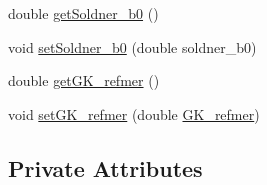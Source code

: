 \begin{DoxyCompactItemize}
\item 
double \hyperlink{classparams_1_1_ellipsoid_parms_a2d57a7d2449fb7bbf6fbc0f66ae85848}{get\+Soldner\+\_\+b0} ()
\item 
void \hyperlink{classparams_1_1_ellipsoid_parms_a0ab99cecabf398adc130b15c8f3e23c5}{set\+Soldner\+\_\+b0} (double soldner\+\_\+b0)
\item 
double \hyperlink{classparams_1_1_ellipsoid_parms_aaa87eb361d5f0be95d014842b8201cea}{get\+G\+K\+\_\+refmer} ()
\item 
void \hyperlink{classparams_1_1_ellipsoid_parms_a711a94a4e810fa3acd91cabc94ef8b73}{set\+G\+K\+\_\+refmer} (double \hyperlink{classparams_1_1_ellipsoid_parms_a86b4e7b5eb4b4f2f671e61e75e0dc7f9}{G\+K\+\_\+refmer})
\end{DoxyCompactItemize}
\subsection*{Private Attributes}
